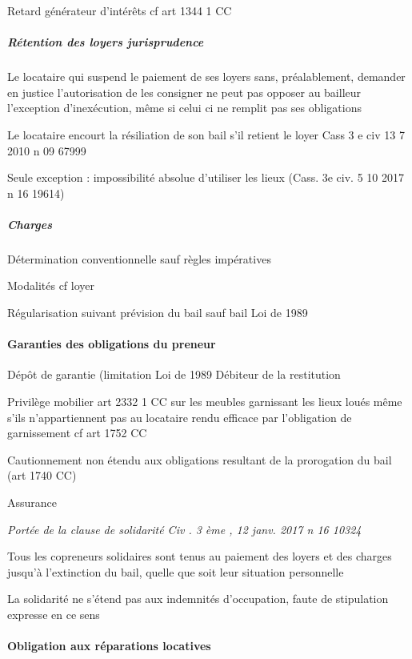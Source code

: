 \documentclass[10pt,a4paper,twoside]{article}
\newenvironment*{focus}[1][]{\medskip \textbf{#1} \newline \itshape}{}
\begin{document}
				Retard générateur d’intérêts cf art 1344 1 CC

			\subparagraph{Rétention des loyers jurisprudence}

				Le locataire qui suspend le paiement de ses loyers sans,
				préalablement, demander en justice l’autorisation de les
				consigner ne peut pas opposer au bailleur l’exception
				d’inexécution, même si celui ci ne remplit pas ses
				obligations

				Le locataire encourt la résiliation de son bail s'il retient le
				loyer Cass 3 e civ 13 7 2010 n 09 67999

				Seule exception : impossibilité absolue d'utiliser les lieux
				(Cass. 3e civ. 5 10 2017 n 16 19614)

			\subparagraph{Charges}
				Détermination conventionnelle sauf règles impératives

				Modalités cf loyer

				Régularisation suivant prévision du bail sauf bail Loi de
				1989

		\paragraph{Garanties des obligations du preneur}

			Dépôt de garantie (limitation Loi de 1989 Débiteur de la
			restitution

			Privilège mobilier art 2332 1 CC sur les meubles
			garnissant les lieux loués même s’ils n’appartiennent pas
			au locataire rendu efficace par l’obligation de
			garnissement cf art 1752 CC

			Cautionnement non étendu aux obligations resultant de la
			prorogation du bail (art 1740 CC)

			Assurance

			\begin{focus}{Portée de la clause de solidarité}
				Civ . 3 ème , 12 janv. 2017 n 16 10324

				Tous les copreneurs solidaires sont tenus au
				paiement des loyers et des charges jusqu’à
				l’extinction du bail, quelle que soit leur
				situation personnelle

				La solidarité ne s’étend pas aux indemnités
				d’occupation, faute de stipulation expresse en
				ce sens
			\end{focus}

		\paragraph{Obligation aux réparations locatives}
\end{document}
